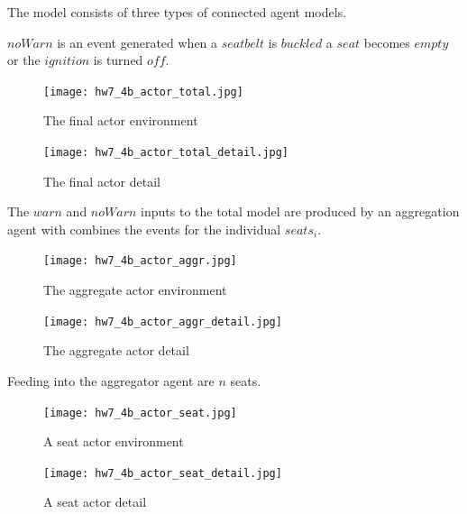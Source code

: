 \documentclass{article}
\begin{document}
The model consists of three types of connected agent models.

$noWarn$ is an event generated when a $seatbelt$ is $buckled$
a $seat$ becomes $empty$ or the $ignition$ is turned $off$.

\begin{figure}[h!]
\centering
\texttt{[image: hw7\_4b\_actor\_total.jpg]}
\caption{The final actor environment}
\label{fig:4b_actor_total_env}
\end{figure}

\begin{figure}[h!]
\centering
\texttt{[image: hw7\_4b\_actor\_total\_detail.jpg]}
\caption{The final actor detail}
\label{fig:4b_actor_total_detail}
\end{figure}

The $warn$ and $noWarn$ inputs to the total model are
produced by an aggregation agent with combines the
events for the individual $seats_i$.

\begin{figure}[h!]
\centering
\texttt{[image: hw7\_4b\_actor\_aggr.jpg]}
\caption{The aggregate actor environment}
\label{fig:4b_actor_aggr_env}
\end{figure}

\begin{figure}[h!]
\centering
\texttt{[image: hw7\_4b\_actor\_aggr\_detail.jpg]}
\caption{The aggregate actor detail}
\label{fig:4b_actor_aggr_detail}
\end{figure}

Feeding into the aggregator agent are $n$ seats.


\begin{figure}[h!]
\centering
\texttt{[image: hw7\_4b\_actor\_seat.jpg]}
\caption{A seat actor environment}
\label{fig:4b_actor_seat_env}
\end{figure}

\begin{figure}[h!]
\centering
\texttt{[image: hw7\_4b\_actor\_seat\_detail.jpg]}
\caption{A seat actor detail}
\label{fig:4b_actor_seat_detail}
\end{figure}
\end{document}
